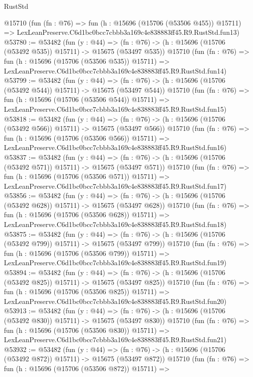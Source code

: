 \begin{lexlean}{RustStd}
\begin{coremodule}
    @15710
    (fun (fn : @76) =>
    fun (h : @15696 (@15706 (@53506 @455)) @15711) =>
    LexLeanPreserve.C6d1bc0bcc7cbbb3a169c4e838883ff45.R9.RustStd.fun13)
@53780 := @53482
    (fun (y : @44) =>
    (fn : @76) -> (h : @15696 (@15706 (@53492 @535)) @15711) -> @15675 (@53497 @535))
    @15710
    (fun (fn : @76) =>
    fun (h : @15696 (@15706 (@53506 @535)) @15711) =>
    LexLeanPreserve.C6d1bc0bcc7cbbb3a169c4e838883ff45.R9.RustStd.fun14)
@53799 := @53482
    (fun (y : @44) =>
    (fn : @76) -> (h : @15696 (@15706 (@53492 @544)) @15711) -> @15675 (@53497 @544))
    @15710
    (fun (fn : @76) =>
    fun (h : @15696 (@15706 (@53506 @544)) @15711) =>
    LexLeanPreserve.C6d1bc0bcc7cbbb3a169c4e838883ff45.R9.RustStd.fun15)
@53818 := @53482
    (fun (y : @44) =>
    (fn : @76) -> (h : @15696 (@15706 (@53492 @566)) @15711) -> @15675 (@53497 @566))
    @15710
    (fun (fn : @76) =>
    fun (h : @15696 (@15706 (@53506 @566)) @15711) =>
    LexLeanPreserve.C6d1bc0bcc7cbbb3a169c4e838883ff45.R9.RustStd.fun16)
@53837 := @53482
    (fun (y : @44) =>
    (fn : @76) -> (h : @15696 (@15706 (@53492 @571)) @15711) -> @15675 (@53497 @571))
    @15710
    (fun (fn : @76) =>
    fun (h : @15696 (@15706 (@53506 @571)) @15711) =>
    LexLeanPreserve.C6d1bc0bcc7cbbb3a169c4e838883ff45.R9.RustStd.fun17)
@53856 := @53482
    (fun (y : @44) =>
    (fn : @76) -> (h : @15696 (@15706 (@53492 @628)) @15711) -> @15675 (@53497 @628))
    @15710
    (fun (fn : @76) =>
    fun (h : @15696 (@15706 (@53506 @628)) @15711) =>
    LexLeanPreserve.C6d1bc0bcc7cbbb3a169c4e838883ff45.R9.RustStd.fun18)
@53875 := @53482
    (fun (y : @44) =>
    (fn : @76) -> (h : @15696 (@15706 (@53492 @799)) @15711) -> @15675 (@53497 @799))
    @15710
    (fun (fn : @76) =>
    fun (h : @15696 (@15706 (@53506 @799)) @15711) =>
    LexLeanPreserve.C6d1bc0bcc7cbbb3a169c4e838883ff45.R9.RustStd.fun19)
@53894 := @53482
    (fun (y : @44) =>
    (fn : @76) -> (h : @15696 (@15706 (@53492 @825)) @15711) -> @15675 (@53497 @825))
    @15710
    (fun (fn : @76) =>
    fun (h : @15696 (@15706 (@53506 @825)) @15711) =>
    LexLeanPreserve.C6d1bc0bcc7cbbb3a169c4e838883ff45.R9.RustStd.fun20)
@53913 := @53482
    (fun (y : @44) =>
    (fn : @76) -> (h : @15696 (@15706 (@53492 @830)) @15711) -> @15675 (@53497 @830))
    @15710
    (fun (fn : @76) =>
    fun (h : @15696 (@15706 (@53506 @830)) @15711) =>
    LexLeanPreserve.C6d1bc0bcc7cbbb3a169c4e838883ff45.R9.RustStd.fun21)
@53932 := @53482
    (fun (y : @44) =>
    (fn : @76) -> (h : @15696 (@15706 (@53492 @872)) @15711) -> @15675 (@53497 @872))
    @15710
    (fun (fn : @76) =>
    fun (h : @15696 (@15706 (@53506 @872)) @15711) =>

\end{coremodule}
\end{lexlean}
